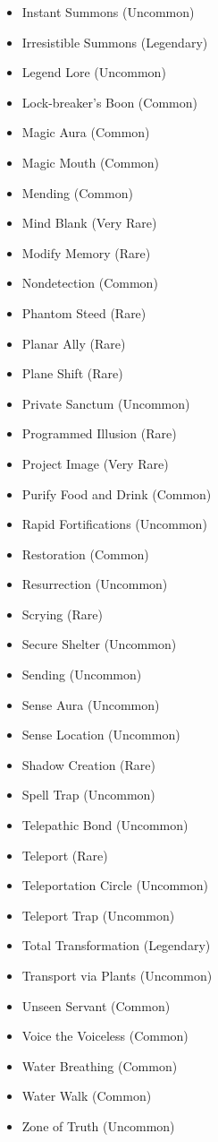 \begin{itemize}
    \item Instant Summons (Uncommon)
    \item Irresistible Summons (Legendary)
    \item Legend Lore (Uncommon)
    \item Lock-breaker's Boon (Common)
    \item Magic Aura (Common)
    \item Magic Mouth (Common)
    \item Mending (Common)
    \item Mind Blank (Very Rare)
    \item Modify Memory (Rare)
    \item Nondetection (Common)
    \item Phantom Steed (Rare)
    \item Planar Ally (Rare)
    \item Plane Shift (Rare)
    \item Private Sanctum (Uncommon)
    \item Programmed Illusion (Rare)
    \item Project Image (Very Rare)
    \item Purify Food and Drink (Common)
    \item Rapid Fortifications (Uncommon)
    \item Restoration (Common)
    \item Resurrection (Uncommon)
    \item Scrying (Rare)
    \item Secure Shelter (Uncommon)
    \item Sending (Uncommon)
		\item Sense Aura (Uncommon)
    \item Sense Location (Uncommon)
    \item Shadow Creation (Rare)
    \item Spell Trap (Uncommon)
    \item Telepathic Bond (Uncommon)
    \item Teleport (Rare)
    \item Teleportation Circle (Uncommon)
    \item Teleport Trap (Uncommon)
    \item Total Transformation (Legendary)
    \item Transport via Plants (Uncommon)
    \item Unseen Servant (Common)
    \item Voice the Voiceless (Common)
    \item Water Breathing (Common)
    \item Water Walk (Common)
    \item Zone of Truth (Uncommon)
\end{itemize}

